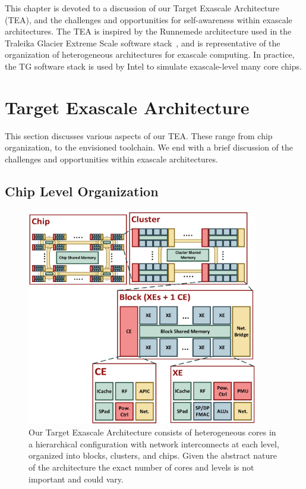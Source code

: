 \label{chap:background}
This chapter is devoted to a discussion of our Target Exascale Architecture (TEA), and the challenges and opportunities for self-awareness within exascale architectures. The TEA is inspired by the Runnemede architecture used in the Traleika Glacier Extreme Scale software stack~\cite{Runnemede, IntelEAS}, and is representative of the organization of heterogeneous architectures for exascale computing. In practice, the TG software stack is used by Intel to simulate exascale-level many core chips.


\section{Target Exascale Architecture}
    This section discusses various aspects of our TEA. These range from chip organization, to the envisioned toolchain. We end with a brief discussion of the challenges and opportunities within exascale architectures.
    \subsection{Chip Level Organization}
        \begin{figure}[htb!]
            \centering
            \includegraphics[width=0.9\textwidth]{Fig/TEA_architecture.pdf}
            \caption[Target Exascale Architecture]{Our Target Exascale Architecture consists of heterogeneous cores in a hierarchical configuration with network interconnects at each level, organized into blocks, clusters, and chips. Given the abstract nature of the architecture the exact number of cores and levels is not important and could vary. }
            \label{fig:TEA}
        \end{figure}

